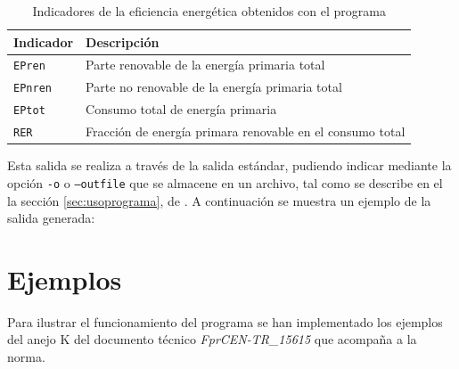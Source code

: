 \documentclass[10pt,notitlepage,oneside,a4paper]{article}
\begin{document}
\begin{table}[H]
\centering
\small
\caption{Indicadores de la eficiencia energética obtenidos con el programa}\label{tab:indicadoresFinales}
\begin{tabular}{ll}
    \toprule
    \textbf{Indicador} & \textbf{Descripción}\\
    \midrule
    \texttt{EPren}  & Parte renovable de la energía primaria total\\
    \texttt{EPnren} & Parte no renovable de la energía primaria total\\
    \texttt{EPtot}  & Consumo total de energía primaria\\
    \texttt{RER}    & Fracción de energía primara renovable en el consumo total\\
    \bottomrule
\end{tabular}
\end{table}

Esta salida se realiza a través de la salida estándar, pudiendo indicar mediante la opción \texttt{-o} o \texttt{--outfile} que se almacene en un archivo, tal como se describe en el la sección \autoref{sec:usoprograma}, de . A continuación se muestra un ejemplo de la salida generada:


\clearpage
\newpage


\setcounter{section}{0} %
\renewcommand\thesection{Anexo~\Roman{section}}
\renewcommand\theHsection{Anexo~\Roman{section}}
\renewcommand\thesubsection{\Roman{section}.\arabic{subsection}}
\renewcommand\theHsubsection{\Roman{section}.\arabic{subsection}}
\renewcommand{\thefigure}{\Roman{section}.\arabic{figure}}
\renewcommand{\theHfigure}{\Roman{section}.\arabic{figure}}
\renewcommand{\thetable}{\Roman{section}.\arabic{table}}
\renewcommand{\theHtable}{\Roman{section}.\arabic{table}}

\section{Ejemplos}
\label{sec:anexoejemplos}
\setcounter{figure}{0} %
\setcounter{table}{0} %

Para ilustrar el funcionamiento del programa se han implementado los ejemplos del anejo K del documento técnico \textit{FprCEN-TR\_15615} que acompaña a la norma.
\end{document}
